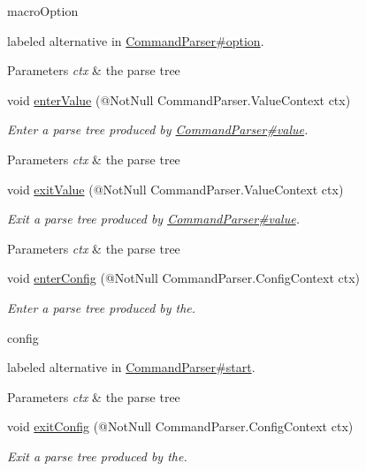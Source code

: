 \begin{DoxyCompactItemize}
\begin{DoxyCompactList}
\begin{DoxyCode}
macroOption 
\end{DoxyCode}
 labeled alternative in \hyperlink{}{Command\+Parser\#option}. 
\begin{DoxyParams}{Parameters}
{\em ctx} & the parse tree\\
\hline
\end{DoxyParams}
 \end{DoxyCompactList}\item 
void \hyperlink{classedu_1_1udel_1_1cis_1_1vsl_1_1civl_1_1run_1_1common_1_1CommandBaseListener_a29b32796768acad164568729817e3845}{enter\+Value} (@Not\+Null Command\+Parser.\+Value\+Context ctx)
\begin{DoxyCompactList}\small\item\em Enter a parse tree produced by \hyperlink{}{Command\+Parser\#value}.


\begin{DoxyParams}{Parameters}
{\em ctx} & the parse tree\\
\hline
\end{DoxyParams}
 \end{DoxyCompactList}\item 
void \hyperlink{classedu_1_1udel_1_1cis_1_1vsl_1_1civl_1_1run_1_1common_1_1CommandBaseListener_a9831dc539b2bb1c18748ce0d9ff46211}{exit\+Value} (@Not\+Null Command\+Parser.\+Value\+Context ctx)
\begin{DoxyCompactList}\small\item\em Exit a parse tree produced by \hyperlink{}{Command\+Parser\#value}.


\begin{DoxyParams}{Parameters}
{\em ctx} & the parse tree\\
\hline
\end{DoxyParams}
 \end{DoxyCompactList}\item 
void \hyperlink{classedu_1_1udel_1_1cis_1_1vsl_1_1civl_1_1run_1_1common_1_1CommandBaseListener_a8ae7b597bb7fbab8f499cdaf78293277}{enter\+Config} (@Not\+Null Command\+Parser.\+Config\+Context ctx)
\begin{DoxyCompactList}\small\item\em Enter a parse tree produced by the.


\begin{DoxyCode}
config 
\end{DoxyCode}
 labeled alternative in \hyperlink{}{Command\+Parser\#start}. 
\begin{DoxyParams}{Parameters}
{\em ctx} & the parse tree\\
\hline
\end{DoxyParams}
 \end{DoxyCompactList}\item 
void \hyperlink{classedu_1_1udel_1_1cis_1_1vsl_1_1civl_1_1run_1_1common_1_1CommandBaseListener_a840fcfc9c54d47e3931622643bcb3aed}{exit\+Config} (@Not\+Null Command\+Parser.\+Config\+Context ctx)
\begin{DoxyCompactList}\small\item\em Exit a parse tree produced by the.



\end{DoxyCompactList}
\end{DoxyCompactItemize}
